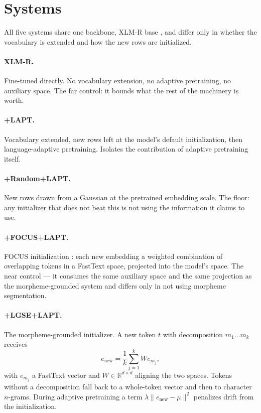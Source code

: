 \documentclass[11pt]{article}
\begin{document}
\section{Systems}

All five systems share one backbone, XLM-R base
\citep{conneau-etal-2020-unsupervised}, and differ only in whether the
vocabulary is extended and how the new rows are initialized.

\paragraph{XLM-R.} Fine-tuned directly. No vocabulary extension, no adaptive
pretraining, no auxiliary space. The far control: it bounds what the rest of
the machinery is worth.

\paragraph{+LAPT.} Vocabulary extended, new rows left at the model's default
initialization, then language-adaptive pretraining. Isolates the
contribution of adaptive pretraining itself.

\paragraph{+Random+LAPT.} New rows drawn from a Gaussian at the pretrained
embedding scale. The floor: any initializer that does not beat this is not
using the information it claims to use.

\paragraph{+FOCUS+LAPT.} FOCUS initialization
\citep{dobler-de-melo-2023-focus}: each new embedding a weighted combination
of overlapping tokens in a FastText space, projected into the model's space.
The near control --- it consumes the same auxiliary space and the same
projection as the morpheme-grounded system and differs only in not using
morpheme segmentation.

\paragraph{+LGSE+LAPT.} The morpheme-grounded initializer. A new token $t$
with decomposition $m_1 \dots m_k$ receives
\begin{equation}
e_{\text{new}} = \frac{1}{k}\sum_{j=1}^{k} W e_{m_j},
\label{eq:lgse}
\end{equation}
with $e_{m_j}$ a FastText vector and $W \in \mathbb{R}^{d \times d}$ aligning
the two spaces. Tokens without a decomposition fall back to a whole-token
vector and then to character $n$-grams. During adaptive pretraining a term
$\lambda\lVert e_{\text{new}} - \mu\rVert^2$ penalizes drift from the
initialization.
\end{document}

